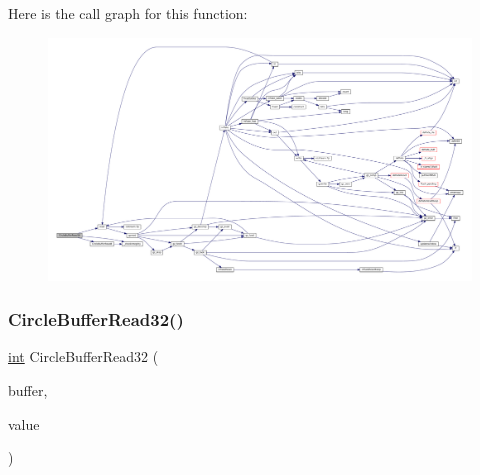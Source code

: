 Here is the call graph for this function\+:
\nopagebreak
\begin{figure}[H]
\begin{center}
\leavevmode
\includegraphics[width=350pt]{circle-buffer_8c_a6379e58465082beba80dc4da5885e39f_cgraph}
\end{center}
\end{figure}
\mbox{\label{circle-buffer_8c_a3f1b62ccdf61258172c305dcb525e31c}} 
\subsubsection{\texorpdfstring{Circle\+Buffer\+Read32()}{CircleBufferRead32()}}
{\footnotesize\ttfamily \mbox{\hyperlink{ioapi_8h_a787fa3cf048117ba7123753c1e74fcd6}{int}} Circle\+Buffer\+Read32 (\begin{DoxyParamCaption}\item[{struct Circle\+Buffer $\ast$}]{buffer,  }\item[{int32\+\_\+t $\ast$}]{value }\end{DoxyParamCaption})}

